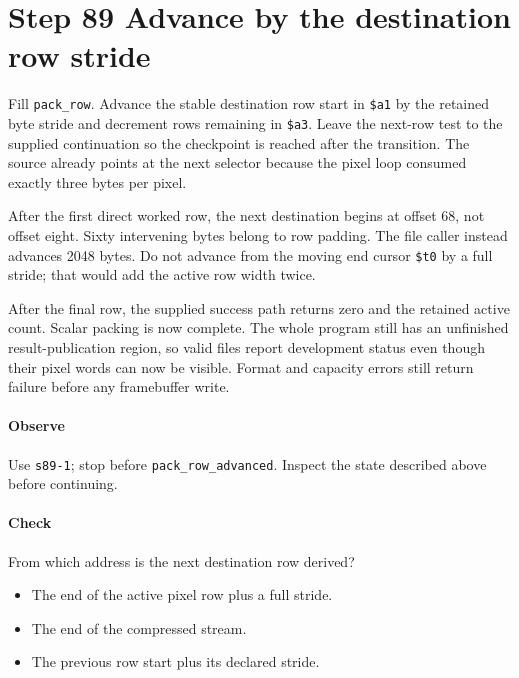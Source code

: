 \section{Step 89 Advance by the destination row stride}
Fill \texttt{pack\_row}. Advance the stable destination row start in \texttt{\$a1} by the retained byte stride and decrement rows remaining in \texttt{\$a3}. Leave the next-row test to the supplied continuation so the checkpoint is reached after the transition. The source already points at the next selector because the pixel loop consumed exactly three bytes per pixel.

After the first direct worked row, the next destination begins at offset 68, not offset eight. Sixty intervening bytes belong to row padding. The file caller instead advances 2048 bytes. Do not advance from the moving end cursor \texttt{\$t0} by a full stride; that would add the active row width twice.

After the final row, the supplied success path returns zero and the retained active count. Scalar packing is now complete. The whole program still has an unfinished result-publication region, so valid files report development status even though their pixel words can now be visible. Format and capacity errors still return failure before any framebuffer write.

\paragraph{Observe} Use \texttt{s89-1}; stop before \texttt{pack\_row\_advanced}. Inspect the state described above before continuing.

\paragraph{Check} From which address is the next destination row derived?
\begin{itemize}
\item[A.] The end of the active pixel row plus a full stride.
\item[B.] The end of the compressed stream.
\item[C.] The previous row start plus its declared stride.
\end{itemize}

